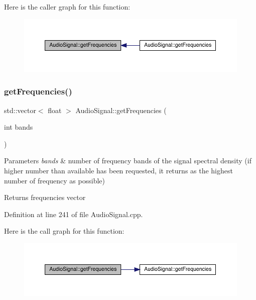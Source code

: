 Here is the caller graph for this function\+:
\nopagebreak
\begin{figure}[H]
\begin{center}
\leavevmode
\includegraphics[width=350pt]{class_audio_signal_a4e45a4b1adc16a9cbd65501efafb6ded_icgraph}
\end{center}
\end{figure}
\mbox{\label{class_audio_signal_a9b7d7a655913f579c0df8b2639b3ce56}} 
\subsubsection{\texorpdfstring{get\+Frequencies()}{getFrequencies()}\hspace{0.1cm}{\footnotesize\ttfamily [2/2]}}
{\footnotesize\ttfamily std\+::vector$<$ float $>$ Audio\+Signal\+::get\+Frequencies (\begin{DoxyParamCaption}\item[{int}]{bands }\end{DoxyParamCaption})}


\begin{DoxyParams}{Parameters}
{\em bands} & number of frequency bands of the signal spectral density (if higher number than available has been requested, it returns as the highest number of frequency as possible) \\
\hline
\end{DoxyParams}
\begin{DoxyReturn}{Returns}
frequencies vector 
\end{DoxyReturn}


Definition at line 241 of file Audio\+Signal.\+cpp.

Here is the call graph for this function\+:
\nopagebreak
\begin{figure}[H]
\begin{center}
\leavevmode
\includegraphics[width=350pt]{class_audio_signal_a9b7d7a655913f579c0df8b2639b3ce56_cgraph}
\end{center}
\end{figure}
\mbox{\label{class_audio_signal_adfa4565e6ff0d8dc6bcbf87dbf6d01d1}} 
